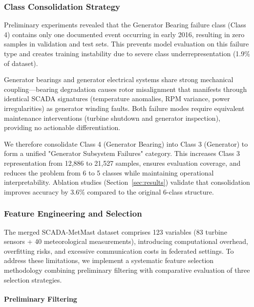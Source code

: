 \documentclass[12pt]{article}
\begin{document}
\subsubsection{Class Consolidation Strategy}

Preliminary experiments revealed that the Generator Bearing failure class (Class 4) contains only one documented event occurring in early 2016, resulting in zero samples in validation and test sets. This prevents model evaluation on this failure type and creates training instability due to severe class underrepresentation (1.9\% of dataset).

Generator bearings and generator electrical systems share strong mechanical coupling—bearing degradation causes rotor misalignment that manifests through identical SCADA signatures (temperature anomalies, RPM variance, power irregularities) as generator winding faults. Both failure modes require equivalent maintenance interventions (turbine shutdown and generator inspection), providing no actionable differentiation.

We therefore consolidate Class 4 (Generator Bearing) into Class 3 (Generator) to form a unified "Generator Subsystem Failures" category. This increases Class 3 representation from 12,886 to 21,527 samples, ensures evaluation coverage, and reduces the problem from 6 to 5 classes while maintaining operational interpretability. Ablation studies (Section~\ref{sec:results}) validate that consolidation improves accuracy by 3.6\% compared to the original 6-class structure.



\subsubsection{Feature Engineering and Selection}
\label{subsubsec:feature_selection}

The merged SCADA-MetMast dataset comprises 123 variables (83 turbine sensors + 40 meteorological measurements), introducing computational overhead, overfitting risks, and excessive communication costs in federated settings. To address these limitations, we implement a systematic feature selection methodology combining preliminary filtering with comparative evaluation of three selection strategies.

\paragraph{Preliminary Filtering}
\end{document}

